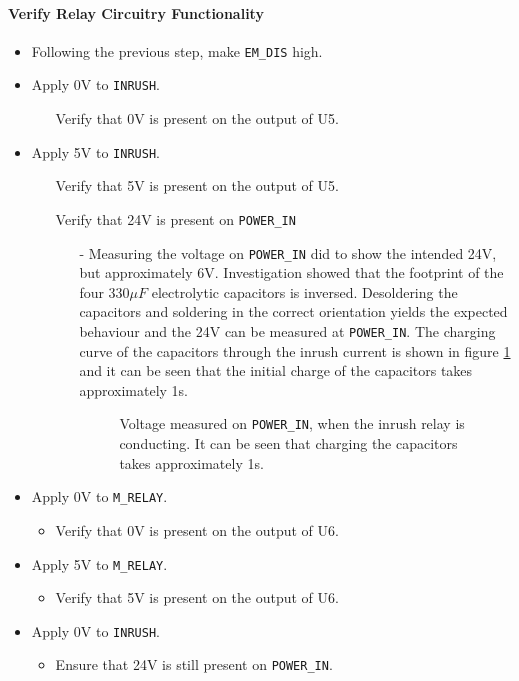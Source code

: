 \paragraph{Verify Relay Circuitry Functionality} %
\label{par:verify_relay_circuitry}
\begin{itemize}
	\item Following the previous step, make \texttt{EM\_DIS} high.
	\item Apply 0V to \texttt{INRUSH}.
	\begin{itemize}
		\item[\cmark] Verify that 0V is present on the output of U5.
	\end{itemize}
	\item Apply 5V to \texttt{INRUSH}.
	\begin{itemize}
		\item[\cmark] Verify that 5V is present on the output of U5.
		\item[\xmark] Verify that 24V is present on \texttt{POWER\_IN}
		\begin{itemize}
			\item[-]  Measuring the voltage on \texttt{POWER\_IN} did to show the intended 24V, but approximately 6V. 
			Investigation showed that the footprint of the four $330 \mu F$ electrolytic capacitors is inversed. 
			Desoldering the capacitors and soldering in the correct orientation yields the expected behaviour and the 24V can be measured at \texttt{POWER\_IN}.
			The charging curve of the capacitors through the inrush current is shown in figure 
			\ref{fig:controllerboardv2_inrushcurrent_charge} and it can be seen that the initial charge of the capacitors takes approximately 1s. 

			\begin{figure}[h]
				\centering
			    
				\caption{Voltage measured on \texttt{POWER\_IN}, when the inrush relay is conducting. It can be seen that charging the capacitors takes approximately 1s. }
				\label{fig:controllerboardv2_inrushcurrent_charge}
			\end{figure}
 
		\end{itemize}
	\end{itemize}
	\item Apply 0V to \texttt{M\_RELAY}.
	\begin{itemize}
		\item Verify that 0V is present on the output of U6.
	\end{itemize}
	\item Apply 5V to \texttt{M\_RELAY}.
	\begin{itemize}
		\item Verify that 5V is present on the output of U6.
	\end{itemize}
	\item Apply 0V to \texttt{INRUSH}.
	\begin{itemize}
		\item Ensure that 24V is still present on \texttt{POWER\_IN}.
	\end{itemize}
\end{itemize}
